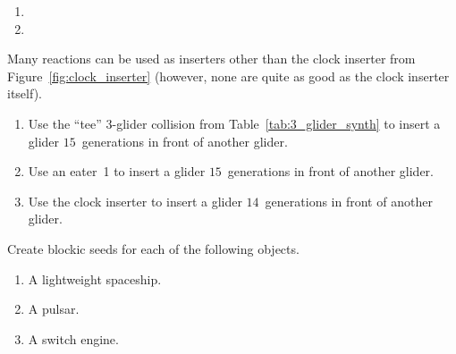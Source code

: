 \begin{multicols}{2}
\begin{problemstar}
\begin{multicols}{2}
\begin{enumerate}[label=\bf\color{ocre}(\alph*)]
			\item[\bf\color{ocre}(c)] 
			
			\item[\bf\color{ocre}(b)] 
		\end{enumerate}
	\end{multicols}
\end{problemstar}


\mfilbreak


\begin{problemstar}\label{exer:other_inserters}
	Many reactions can be used as inserters other than the clock inserter from Figure~\ref{fig:clock_inserter} (however, none are quite as good as the clock inserter itself).
	\begin{enumerate}[label=\bf\color{ocre}(\alph*)]
		\item Use the ``tee'' $3$-glider collision from Table~\ref{tab:3_glider_synth} to insert a glider $15$~generations in front of another glider.
		
		\item Use an eater~1 to insert a glider $15$~generations in front of another glider.
		
		
		\item Use the clock inserter to insert a glider $14$~generations in front of another glider.
	\end{enumerate}
\end{problemstar}


\mfilbreak


\begin{problem}\label{exer:other_blockic}
	Create blockic seeds for each of the following objects.
	
	\begin{enumerate}[label=\bf\color{ocre}(\alph*)]
		\item A lightweight spaceship.
		
		\item A pulsar.
		
		\item A switch engine.
	\end{enumerate}
\end{problem}



\end{multicols}

